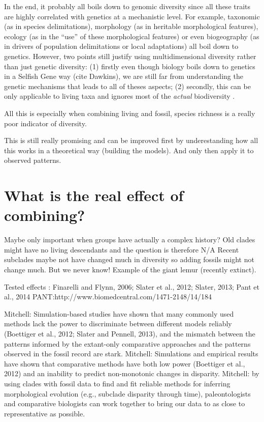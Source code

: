 In the end, it probably all boils down to genomic diversity since all these traits are highly correlated with genetics at a mechanistic level.
For example, taxonomic (as in species delimitations), morphology (as in heritable morphological features), ecology (as in the ``use'' of these morphological features) or even biogeography (as in drivers of population delimitations or local adaptations) all boil down to genetics.
However, two points still justify using multidimensional diversity rather than just genetic diversity: (1) firstly even though biology boils down to genetics in a Selfish Gene way (cite Dawkins), we are still far from understanding the genetic mechanisms that leads to all of theses aspects; (2) secondly, this can be only applicable to living taxa and ignores most of the \textit{actual} biodiversity \citep{novacek1992ext,raup1993extinction}.

All this is especially when combining living and fossil, species richness is a really poor indicator of diversity.

This is still really promising and can be improved first by underestanding how all this works in a theoretical way (building the models).
And only then apply it to observed patterns.

\section{What is the real effect of combining?}
Maybe only important when groups have actually a complex history?
Old clades might have no living descendants and the question is therefore N/A
Recent subclades maybe not have changed much in diversity so adding fossils might not change much.
But we never know! Example of the giant lemur (recently extinct).

Tested effects : Finarelli and Flynn, 2006; Slater et al., 2012; Slater, 2013; Pant et al., 2014   PANT:http://www.biomedcentral.com/1471-2148/14/184


Mitchell: Simulation-based studies have shown that many commonly used methods lack the power to discriminate between different models reliably (Boettiger et al., 2012; Slater and Pennell, 2013), and the mismatch between the patterns informed by the extant-only comparative approaches and the patterns observed in the fossil record are stark.
Mitchell: Simulations and empirical results have shown that comparative methods have both low power (Boettiger et al., 2012) and an inability to predict non-monotonic changes in disparity.
Mitchell: by using clades with fossil data to find and fit reliable methods for inferring morphological evolution (e.g., subclade disparity through time), paleontologists and comparative biologists can work together to bring our data to as close to representative as possible.

